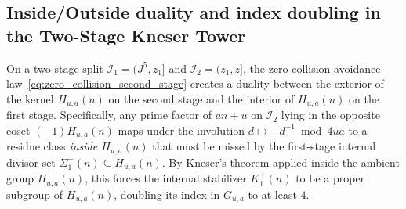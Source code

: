 \documentclass[11pt, a4paper]{article}
\theoremstyle{plain}
\theoremstyle{definition}
\begin{document}
\subsection{Inside/Outside duality and index doubling in the Two-Stage Kneser Tower}\label{subsec:kneser_tower}

On a two-stage split $\mathcal{I}_1=(J^{5},z_1]$ and $\mathcal{I}_2=(z_1,z]$, the zero-collision avoidance law~\eqref{eq:zero_collision_second_stage} creates a duality between the exterior of the kernel $H_{u,a}(n)$ on the second stage and the interior of $H_{u,a}(n)$ on the first stage. Specifically, any prime factor of $an+u$ on $\mathcal{I}_2$ lying in the opposite coset $(-1)H_{u,a}(n)$ maps under the involution $d\mapsto-d^{-1}\bmod 4ua$ to a residue class \emph{inside $H_{u,a}(n)$} that must be missed by the first-stage internal divisor set $\Sigma_1^{+}(n)\subseteq H_{u,a}(n)$. By Kneser's theorem applied inside the ambient group $H_{u,a}(n)$, this forces the internal stabilizer $K_1^{+}(n)$ to be a proper subgroup of $H_{u,a}(n)$, doubling its index in $G_{u,a}$ to at least $4$.
\end{document}
